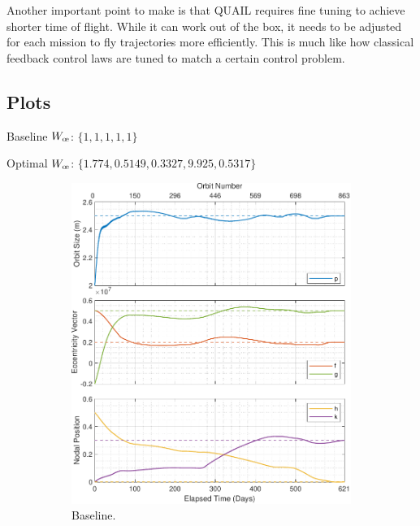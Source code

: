 Another important point to make is that QUAIL requires fine tuning to achieve shorter time of flight. While it can work out of the box, it needs to be adjusted for each mission to fly trajectories more efficiently. This is much like how classical feedback control laws are tuned to match a certain control problem.

\newpage
\subsection{Plots}
\label{sec:bench_case_plot}
Baseline \(W_{\moe}\): \(\{1, 1, 1, 1, 1\}\)


Optimal \(W_{\moe}\): \(\{1.774, 0.5149, 0.3327, 9.925, 0.5317\}\)

\begin{figure}[H]
    \centering
    \begin{subfigure}[t]{0.49\textwidth}
        \includegraphics[width=\textwidth]{figures/benchmark_transfer/orbital_elements.pdf}
        \caption{Baseline.}
        \label{fig:results_optim_a_1}
    \end{subfigure}
    \begin{subfigure}[t]{0.49\textwidth}

\end{subfigure}
\end{figure}
